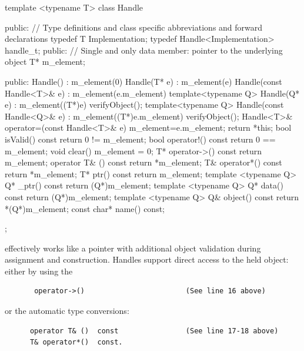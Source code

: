 \documentclass[10pt,a4paper]{article}
\begin{document}
\begin{code}
template <typename T> class Handle  {
public:
      // Type definitions and class specific abbreviations and forward declarations
      typedef T Implementation;
      typedef Handle<Implementation> handle_t;
public:
      // Single and only data member: pointer to the underlying object  
      T* m_element;

public:
      Handle() : m_element(0)                  {                                     }
      Handle(T* e) : m_element(e)              {                                     }
      Handle(const Handle<T>& e) : m_element(e.m_element) {                          }
      template<typename Q> Handle(Q* e)
      : m_element((T*)e)                       { verifyObject();                     }
      template<typename Q> Handle(const Handle<Q>& e) 
      : m_element((T*)e.m_element)             { verifyObject();                     }
      Handle<T>& operator=(const Handle<T>& e) { m_element=e.m_element; return *this;}
      bool isValid() const                     { return 0 != m_element;              }
      bool operator!() const                   { return 0 == m_element;              }
      void clear()                             { m_element = 0;                      }
      T* operator->() const                    { return  m_element;                  }
      operator T& ()  const                    { return *m_element;                  }
      T& operator*()  const                    { return *m_element;                  }
      T* ptr() const                           { return  m_element;                  }
      template <typename Q> Q* _ptr() const    { return  (Q*)m_element;              }
      template <typename Q> Q*  data() const   { return  (Q*)m_element;              }
      template <typename Q> Q&  object() const { return *(Q*)m_element;              }
      const char* name() const;
};
\end{code}

\noindent
effectively works like a pointer with additional object validation during assignment
and construction. Handles support direct access to the held object: either by using 
the 

\begin{verbatim}
       operator->()                        (See line 16 above)
\end{verbatim}

\noindent
or the automatic type conversions:

\begin{verbatim}
      operator T& ()  const                (See line 17-18 above)
      T& operator*()  const.
\end{verbatim}
\end{document}
